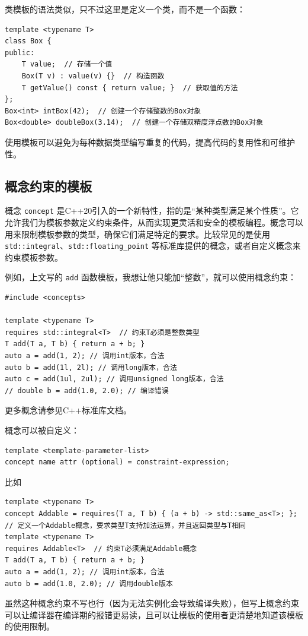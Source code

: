 类模板的语法类似，只不过这里是定义一个类，而不是一个函数：
\begin{verbatim}
template <typename T>
class Box {
public:
    T value;  // 存储一个值
    Box(T v) : value(v) {}  // 构造函数
    T getValue() const { return value; }  // 获取值的方法
};
Box<int> intBox(42);  // 创建一个存储整数的Box对象
Box<double> doubleBox(3.14);  // 创建一个存储双精度浮点数的Box对象
\end{verbatim}
使用模板可以避免为每种数据类型编写重复的代码，提高代码的复用性和可维护性。

\subsection{概念约束的模板}

概念 \verb|concept| 是C++20引入的一个新特性，指的是“某种类型满足某个性质”。它允许我们为模板参数定义约束条件，从而实现更灵活和安全的模板编程。概念可以用来限制模板参数的类型，确保它们满足特定的要求。比较常见的是使用 \verb|std::integral|、\verb|std::floating_point| 等标准库提供的概念，或者自定义概念来约束模板参数。

例如，上文写的 \verb|add| 函数模板，我想让他只能加“整数”，就可以使用概念约束：
\begin{verbatim}
#include <concepts>

template <typename T>
requires std::integral<T>  // 约束T必须是整数类型
T add(T a, T b) { return a + b; }
auto a = add(1, 2); // 调用int版本，合法
auto b = add(1l, 2l); // 调用long版本，合法
auto c = add(1ul, 2ul); // 调用unsigned long版本，合法
// double b = add(1.0, 2.0); // 编译错误
\end{verbatim}
更多概念请参见C++标准库文档。

概念可以被自定义：
\begin{verbatim}
template <template-parameter-list>
concept name attr (optional) = constraint-expression;
\end{verbatim}

比如
\begin{verbatim}
template <typename T>
concept Addable = requires(T a, T b) { (a + b) -> std::same_as<T>; };  // 定义一个Addable概念，要求类型T支持加法运算，并且返回类型与T相同
template <typename T>
requires Addable<T>  // 约束T必须满足Addable概念
T add(T a, T b) { return a + b; }
auto a = add(1, 2); // 调用int版本，合法
auto b = add(1.0, 2.0); // 调用double版本
\end{verbatim}
虽然这种概念约束不写也行（因为无法实例化会导致编译失败），但写上概念约束可以让编译器在编译期的报错更易读，且可以让模板的使用者更清楚地知道该模板的使用限制。


